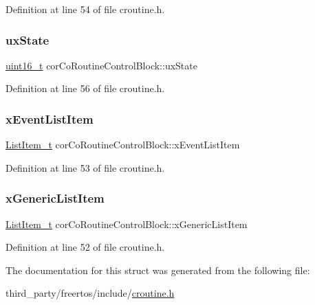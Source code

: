 Definition at line 54 of file croutine.\+h.

\mbox{\label{structcorCoRoutineControlBlock_aa0d702ff5a23c61598fe13e5a78fb1dc}} 
\subsubsection{\texorpdfstring{ux\+State}{uxState}}
{\footnotesize\ttfamily \hyperlink{stdint_8h_a273cf69d639a59973b6019625df33e30}{uint16\+\_\+t} cor\+Co\+Routine\+Control\+Block\+::ux\+State}



Definition at line 56 of file croutine.\+h.

\mbox{\label{structcorCoRoutineControlBlock_a105d316da0069f766acc3b210afed1b9}} 
\subsubsection{\texorpdfstring{x\+Event\+List\+Item}{xEventListItem}}
{\footnotesize\ttfamily \hyperlink{list_8h_a1a62d469392f9bfe2443e7efab9c8398}{List\+Item\+\_\+t} cor\+Co\+Routine\+Control\+Block\+::x\+Event\+List\+Item}



Definition at line 53 of file croutine.\+h.

\mbox{\label{structcorCoRoutineControlBlock_aa2900494db8782eeb8ef12d482501406}} 
\subsubsection{\texorpdfstring{x\+Generic\+List\+Item}{xGenericListItem}}
{\footnotesize\ttfamily \hyperlink{list_8h_a1a62d469392f9bfe2443e7efab9c8398}{List\+Item\+\_\+t} cor\+Co\+Routine\+Control\+Block\+::x\+Generic\+List\+Item}



Definition at line 52 of file croutine.\+h.



The documentation for this struct was generated from the following file\+:\begin{DoxyCompactItemize}
\item 
third\+\_\+party/freertos/include/\hyperlink{croutine_8h}{croutine.\+h}\end{DoxyCompactItemize}

